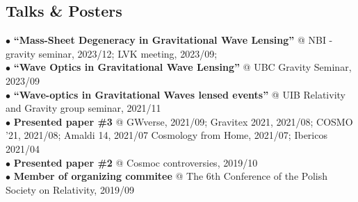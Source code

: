 \documentclass[letterpaper]{twentysecondcv} %
\begin{document}
\subsection{Talks \& Posters}
\iffalse
\begin{itemize}
    \item \textbf{``Wave-optics in Gravitational Waves lensed events''} @ UIB Relativity and Gravity group seminar, 2021/11 
    \item \textbf{Presented paper \#3} @ GWverse, 2021/09; 
                                         Gravitex 2021, 2021/08;
                                         COSMO '21, 2021/08;
                                         Amaldi 14, 2021/07
                                         Cosmology from Home, 2021/07;
                                         Ibericos 2021/04
    \item \textbf{Presented paper \#2} @ Cosmoc controversies, 2019/10
    \item \textbf{Member of organizing commitee} @ The 6th Conference of the Polish Society on Relativity, 2019/09
\end{itemize}
\fi
$\bullet$ \textbf{``Mass-Sheet Degeneracy in Gravitational Wave Lensing''} @ NBI - gravity seminar, 2023/12;
    LVK meeting, 2023/09;\\
$\bullet$ \textbf{``Wave Optics in Gravitational Wave Lensing''} @ UBC Gravity Seminar, 2023/09\\
$\bullet$ \textbf{``Wave-optics in Gravitational Waves lensed events''} @ UIB Relativity and Gravity group seminar, 2021/11\\
$\bullet$ \textbf{Presented paper \#3} @ GWverse, 2021/09; 
    Gravitex 2021, 2021/08;
    COSMO '21, 2021/08;
    Amaldi 14, 2021/07
    Cosmology from Home, 2021/07;
    Ibericos 2021/04
    \\
$\bullet$ \textbf{Presented paper \#2} @ Cosmoc controversies, 2019/10\\
$\bullet$ \textbf{Member of organizing commitee} @ The 6th Conference of the Polish Society on Relativity, 2019/09


\iffalse
\subsection{Participation}
{\small
    \textbf{LVK meeting}, 2023/03 
    - \textbf{12$^{\rm th}$ Iberian Gravitational Waves Meeting}, 2022/06
    - \textbf{The 16$^{\rm th}$ Iberian Cosmology Meeting}, 2022/05
    - \textbf{XIV Tonale Winter School on Cosmology}, 2021/12
    - \textbf{4$^{\rm th}$ Azores school on Observational Cosmology}, 2021/09
    - \textbf{GW Open Data Workshop \#4}, 2021/05
    - \textbf{11$^{\rm th}$ Iberian Gravitational Waves Meeting}, 2021/06
    - \textbf{Workshop on Gravitational Wave Astrophysics for Early Career Scientists}, 2021/05
    - \textbf{First EuCAPT Annual Symposium}, May 2021
    - \textbf{Current challenges in gravitational physics}, April 2021
    - \textbf{IPARCOS School on Cosmology}, 2019/12
    - \textbf{XIII Tonale Winter School on Cosmology}, December 2019
}

{\footnotesize The complete list with slides and link to conferences at \href[pdfnewwindow=true]{https://www.paolocremonese.com/CV.html#conferences}{paolocremonese.com/CV}}
\fi
\end{document}
